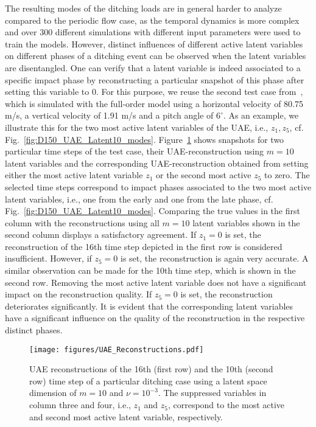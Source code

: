 \smallskip
The resulting modes of the ditching loads are in general harder to analyze compared to the periodic flow case, as the temporal dynamics is more complex and over 300 different simulations with different input parameters were used to train the models. However, distinct influences of different active latent variables on different phases of a ditching event can be observed when the latent variables are disentangled.
%
One can verify that a latent variable is indeed associated to a specific impact phase by reconstructing a particular snapshot of this phase after setting this variable to 0. For this purpose, we reuse the second test case from~\cite{schwarz:2024}, which is simulated with the full-order model using a horizontal velocity of 80.75 m/s, a vertical velocity of 1.91 m/s and a pitch angle of $6^\circ$. 
As an example, we illustrate this for the two most active latent variables of the UAE, i.e., $z_1, z_5$, cf. Fig.~\ref{fig:D150_UAE_Latent10_modes}. Figure~\ref{fig:D150_UAE_reconstructions} shows snapshots for two particular time steps of the test case, their UAE-reconstruction using $m=10$ latent variables and the corresponding UAE-reconstruction obtained from setting either the most active latent variable $z_1$ or the second most active $z_5$ to zero. The selected time steps correspond to impact phases associated to the two most active latent variables, i.e., one from the early and one from the late phase, cf. Fig.~\ref{fig:D150_UAE_Latent10_modes}. 
Comparing the true values in the first column with the reconstructions using all $m=10$ latent variables shown in the second column displays a satisfactory agreement. If $z_1=0$ is set, the reconstruction of the 16th time step depicted in the first row is considered insufficient. However, if $z_5=0$ is set, the reconstruction is again very accurate.
A similar observation can be made for the 10th time step, which is shown in the second row. Removing the most active latent variable does not have a significant impact on the reconstruction quality. If $z_5=0$ is set, the reconstruction deteriorates significantly. 
It is evident that the corresponding latent variables have a significant influence on the quality of the reconstruction in the respective distinct phases. 

\begin{figure}[h!]
    \centering
    \texttt{[image: figures/UAE\_Reconstructions.pdf]}
    \caption{UAE reconstructions of the 16th (first row) and the 10th (second row) time step of a particular ditching case
    using a latent space dimension of $m=10$ and $\nu=10^{-3}$. 
    The suppressed variables in column three and four, i.e., $z_1$ and $z_5$, correspond to the most active and second most active latent variable, respectively.}
    \label{fig:D150_UAE_reconstructions}
\end{figure}

